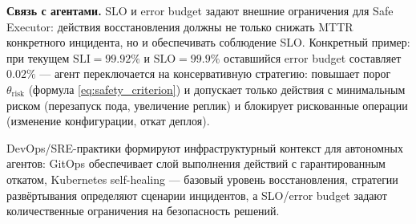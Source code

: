 \textbf{Связь с агентами.} SLO и error budget задают внешние ограничения для Safe Executor: действия восстановления должны не только снижать MTTR конкретного инцидента, но и обеспечивать соблюдение SLO. Конкретный пример: при текущем $\text{SLI} = 99.92\%$ и $\text{SLO} = 99.9\%$ оставшийся error budget составляет $0.02\%$ --- агент переключается на консервативную стратегию: повышает порог $\theta_{\text{risk}}$ (формула \ref{eq:safety_criterion}) и допускает только действия с минимальным риском (перезапуск пода, увеличение реплик) и блокирует рискованные операции (изменение конфигурации, откат деплоя).

\medskip

DevOps/SRE-практики формируют инфраструктурный контекст для автономных агентов: GitOps обеспечивает слой выполнения действий с гарантированным откатом, Kubernetes self-healing --- базовый уровень восстановления, стратегии развёртывания определяют сценарии инцидентов, а SLO/error budget задают количественные ограничения на безопасность решений.
